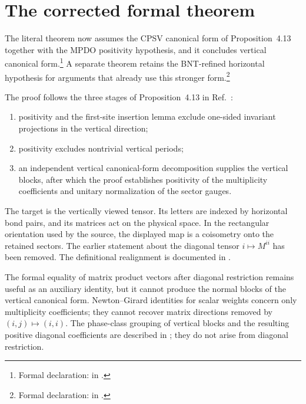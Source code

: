 \documentclass{article}
\begin{document}
\section{The corrected formal theorem}

The literal theorem now assumes the CPSV canonical form of Proposition~4.13
together with the MPDO positivity hypothesis, and it concludes vertical
canonical form.\footnote{Formal declaration:
     in
    .}
A separate theorem retains the BNT-refined horizontal hypothesis
 for arguments that already use this stronger
form.\footnote{Formal declaration:
     in
    .}

The proof follows the three stages of Proposition~4.13 in
Ref.~\cite{Cirac2016MPDO_arXiv}:
\begin{enumerate}
    \item positivity and the first-site insertion lemma exclude one-sided
          invariant projections in the vertical direction;
    \item positivity excludes nontrivial vertical periods;
    \item an independent vertical canonical-form decomposition supplies the
          vertical blocks, after which the proof establishes positivity of the
          multiplicity coefficients and unitary normalization of the sector gauges.
\end{enumerate}

The target is the vertically viewed tensor. Its letters are indexed by
horizontal bond pairs, and its matrices act on the physical space. In the
rectangular orientation used by the source, the displayed map is a coisometry
onto the retained sectors. The earlier statement about the diagonal tensor
$i\mapsto M^{ii}$ has been removed. The definitional realignment is documented
in .

The formal equality of matrix product vectors after diagonal restriction
remains useful as an auxiliary identity, but it cannot produce the normal
blocks of the vertical canonical form. Newton--Girard identities for scalar
weights concern only multiplicity coefficients; they cannot recover matrix
directions removed by $(i,j)\mapsto(i,i)$. The phase-class grouping of vertical
blocks and the resulting positive diagonal coefficients are described in
; they do not arise from diagonal
restriction.
\end{document}
